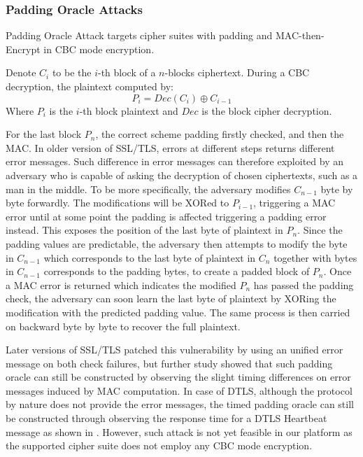 \subsubsection{Padding Oracle Attacks}

Padding Oracle Attack\cite{PaddingOracle} targets cipher suites with padding and MAC-then-Encrypt in CBC mode encryption.

Denote $C_i$ to be the $i$-th block of a $n$-blocks ciphertext. During a CBC decryption, the plaintext computed by:
\begin{equation}
	P_i = Dec(C_i) \oplus C_{i-1}
\end{equation}
Where $P_i$ is the $i$-th block plaintext and $Dec$ is the block cipher decryption.

For the last block $P_n$, the correct scheme padding firstly checked, and then the MAC. In older version of SSL/TLS, errors at different steps returns different error messages. Such difference in error messages can therefore exploited by an adversary who is capable of asking the decryption of chosen ciphertexts, such as a man in the middle. To be more specifically, the adversary modifies $C_{n-1}$ byte by byte forwardly. The modifications will be XORed to $P_{i-1}$, triggering a MAC error until at some point the padding is affected  triggering a padding error instead. This exposes the position of the last byte of plaintext in $P_n$. Since the padding values are predictable, the adversary then attempts to modify the byte in $C_{n-1}$ which corresponds to the last byte of plaintext in $C_n$ together with bytes in $C_{n-1}$ corresponds to the padding bytes, to create a padded block of $P_n$. Once a MAC error is returned which indicates the modified $P_n$ has passed the padding check, the adversary can soon learn the last byte of plaintext by XORing the modification with the predicted padding value. The same process is then carried on backward byte by byte to recover the full plaintext.

Later versions of SSL/TLS patched this vulnerability by using an unified error message on both check failures, but further study showed that such padding oracle can still be constructed by observing the slight timing differences on error messages induced by MAC computation. In case of DTLS, although the protocol by nature does not provide the error messages, the timed padding oracle can still be constructed through observing the response time for a DTLS Heartbeat message as shown in \cite{Lucky13}. However, such attack is not yet feasible in our platform as the supported cipher suite does not employ any CBC mode encryption.


